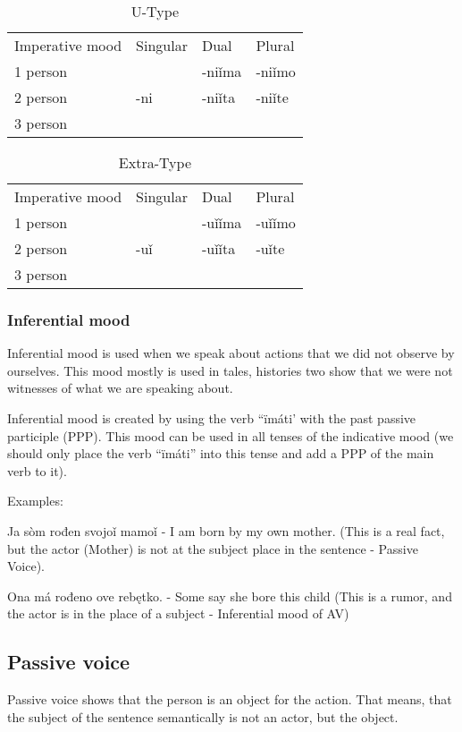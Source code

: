 \begin{table}
	\caption{U-Type}
	\begin{tabular}{llll}
		Imperative mood & Singular & Dual & Plural \\
		1 person &  & -niǐma & -niǐmo \\
		2 person & -ni & -niǐta & -niǐte \\
		3 person &  &  & 
	\end{tabular}
\end{table}


\begin{table}
	\caption{Extra-Type}
	\begin{tabular}{llll}
		Imperative mood & Singular & Dual & Plural \\
		1 person &  & -uǐǐma & -uǐǐmo \\
		2 person & -uǐ & -uǐǐta & -uǐte \\
		3 person &  &  & 
	\end{tabular}
\end{table}

\subsubsection{Inferential mood}

Inferential mood is used when we speak about actions that we did not observe by ourselves. This mood mostly is used in tales, histories two show that we were not witnesses of what we are speaking about.

Inferential mood is created by using the verb “ïmáti’ with the past passive participle (PPP). This mood can be used in all tenses of the indicative mood (we should only place the verb “ïmáti” into this tense and add a PPP of the main verb to it). 

Examples:

Ja sòm rođen svojoǐ mamoǐ - I am born by my own mother. (This is a real fact, but the actor (Mother) is not at the subject place in the sentence - Passive Voice).

Ona má rođeno ove rebętko. - Some say she bore this child (This is a rumor, and the actor is in the place of a subject - Inferential mood of AV)

\subsection{Passive voice}

Passive voice shows that the person is an object for the action. That means, that the subject of the sentence semantically is not an actor, but the object. 

